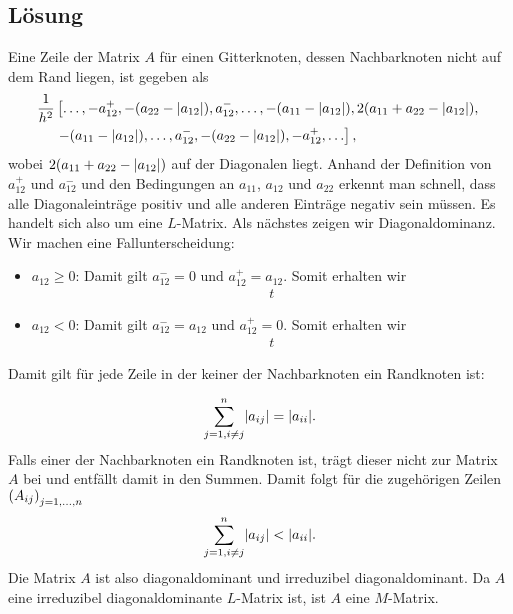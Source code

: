 \documentclass{exercise}
\begin{document}
    \subsection*{Lösung}
    Eine Zeile der Matrix \(A\) für einen Gitterknoten, dessen Nachbarknoten nicht auf dem Rand liegen, ist gegeben als
    \begin{align*}
        \frac{1}{h^2}&\left[\ldots, -a_{12}^+, -\parentheses*{a_{22} - \absolute*{a_{12}}}, a_{12}^-, \ldots, -\parentheses*{a_{11} - \absolute*{a_{12}}}, 2\parentheses*{a_{11} + a_{22} - \absolute*{a_{12}}},\right.\\
        &\left.-\parentheses*{a_{11} - \absolute*{a_{12}}}, \ldots, a_{12}^-, -\parentheses*{a_{22} - \absolute*{a_{12}}}, -a_{12}^+, \ldots\right],
    \end{align*}
    wobei \(2\parentheses*{a_{11} + a_{22} - \absolute*{a_{12}}}\) auf der Diagonalen liegt.
    Anhand der Definition von \(a_{12}^+\) und \(a_{12}^-\) und den Bedingungen an \(a_{11}\), \(a_{12}\) und \(a_{22}\) erkennt man schnell, dass alle Diagonaleinträge positiv und alle anderen Einträge negativ sein müssen.
    Es handelt sich also um eine \(L\)-Matrix.
    Als nächstes zeigen wir Diagonaldominanz.
    Wir machen eine Fallunterscheidung:
    \begin{itemize}
        \item \(a_{12} \ge 0\): Damit gilt \(a_{12}^- = 0\) und \(a_{12}^+ = a_{12}\).
        Somit erhalten wir
        \begin{align*}
            t
        \end{align*}
        \item \(a_{12} < 0\): Damit gilt \(a_{12}^- = a_{12}\) und \(a_{12}^+ = 0\).
        Somit erhalten wir
        \begin{align*}
            t
        \end{align*}
    \end{itemize}
    Damit gilt für jede Zeile in der keiner der Nachbarknoten ein Randknoten ist:

    \[
        \sum_{j = 1, i \ne j}^n \absolute*{a_{ij}} = \absolute*{a_{ii}}.
    \]
    Falls einer der Nachbarknoten ein Randknoten ist, trägt dieser nicht zur Matrix \(A\) bei und entfällt damit in den Summen.
    Damit folgt für die zugehörigen Zeilen \(\parentheses*{A_{ij}}_{j = 1, \ldots, n}\)
    \[
        \sum_{j = 1, i \ne j}^n \absolute*{a_{ij}} < \absolute*{a_{ii}}.
    \]
    Die Matrix \(A\) ist also diagonaldominant und irreduzibel diagonaldominant.
    Da \(A\) eine irreduzibel diagonaldominante \(L\)-Matrix ist, ist \(A\) eine \(M\)-Matrix.
\end{document}
